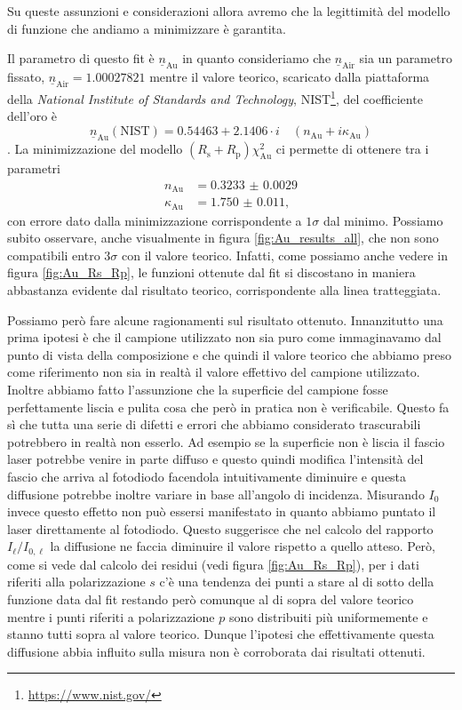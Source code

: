 \documentclass[
    prb,altaffilletter,citeautoscript,
    amsmath,amssymb,
    showpacs,showkeys,floatfix,
    reprint
]{revtex4-1}
\begin{document}
Su queste assunzioni e considerazioni allora avremo che la legittimità del modello di funzione che andiamo a minimizzare è garantita. 

Il parametro di questo fit è $\underline n_\mathrm{Au}$ in quanto consideriamo che $\underline n_\mathrm{Air}$ sia un parametro fissato, $\underline n_\mathrm{Air} = \num{1.00027821}$ mentre il valore teorico, scaricato dalla piattaforma della \emph{National Institute of Standards and Technology}, NIST\footnote{\url{https://www.nist.gov/}}, del coefficiente dell'oro è \[\underline n_\mathrm{Au}(\mathrm{NIST}) = 0.54463 + 2.1406\cdot i \quad(n_\mathrm{Au}+i\kappa_\mathrm{Au})\]. La minimizzazione del modello $(R_\mathrm{s}+R_\mathrm{p})\chi^2_\mathrm{Au}$ ci permette di ottenere tra i parametri
\begin{align*}
    n_\mathrm{Au} &= \num{0.3233(29)} \\
    \kappa_\mathrm{Au} &= \num{1.750(11)},
\end{align*} con errore dato dalla minimizzazione corrispondente a $1\sigma$ dal minimo. Possiamo subito osservare, anche visualmente in figura \ref{fig:Au_results_all}, che non sono compatibili entro $3\sigma$ con il valore teorico. Infatti, come possiamo anche vedere in figura \ref{fig:Au_Rs_Rp}, le funzioni ottenute dal fit si discostano in maniera abbastanza evidente dal risultato teorico, corrispondente alla linea tratteggiata.

Possiamo però fare alcune ragionamenti sul risultato ottenuto. Innanzitutto una prima ipotesi è che il campione utilizzato non sia puro come immaginavamo dal punto di vista della composizione e che quindi il valore  teorico che abbiamo preso come riferimento non sia in realtà il valore effettivo del campione utilizzato. Inoltre abbiamo fatto l'assunzione che la superficie del campione fosse perfettamente liscia e pulita cosa che però in pratica non è verificabile. Questo fa sì che tutta una serie di difetti e errori che abbiamo considerato trascurabili potrebbero in realtà non esserlo. Ad esempio se la superficie non è liscia il fascio laser potrebbe venire in parte diffuso e questo quindi modifica l'intensità del fascio che arriva al fotodiodo facendola intuitivamente diminuire e questa diffusione potrebbe inoltre variare in base all'angolo di incidenza. Misurando $I_{0}$ invece questo effetto non può essersi manifestato in quanto abbiamo puntato il laser direttamente al fotodiodo. Questo suggerisce che nel calcolo del rapporto $I_\ell/I_{0,\ell}$ la diffusione ne faccia diminuire il valore rispetto a quello atteso. Però, come si vede dal calcolo dei residui (vedi figura \ref{fig:Au_Rs_Rp}), per i dati riferiti alla polarizzazione $s$ c'è una tendenza dei punti a stare al di sotto della funzione data dal fit restando però comunque al di sopra del valore teorico mentre i punti riferiti a polarizzazione $p$ sono distribuiti più uniformemente e stanno tutti sopra al valore teorico. Dunque l'ipotesi che effettivamente questa diffusione abbia influito sulla misura non è corroborata dai risultati ottenuti.
\end{document}
